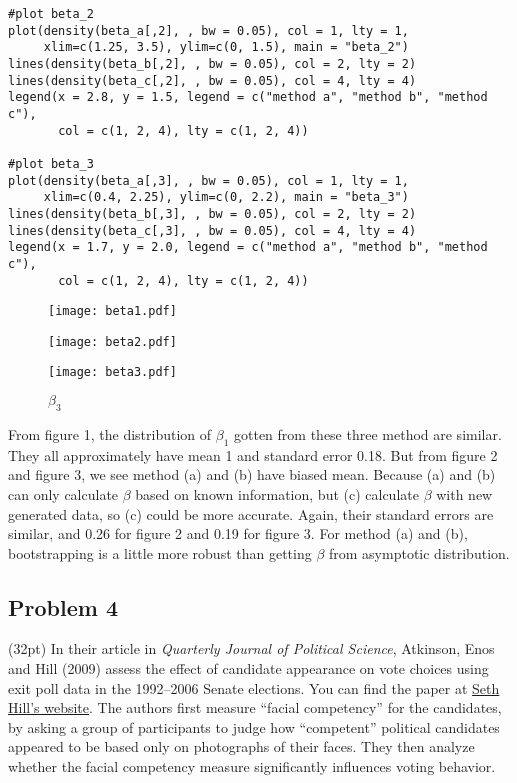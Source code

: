 \documentclass[11pt,english]{article}
\begin{document}
\begin{enumerate}
\begin{verbatim}
#plot beta_2
plot(density(beta_a[,2], , bw = 0.05), col = 1, lty = 1,
     xlim=c(1.25, 3.5), ylim=c(0, 1.5), main = "beta_2")
lines(density(beta_b[,2], , bw = 0.05), col = 2, lty = 2)
lines(density(beta_c[,2], , bw = 0.05), col = 4, lty = 4)
legend(x = 2.8, y = 1.5, legend = c("method a", "method b", "method c"),
       col = c(1, 2, 4), lty = c(1, 2, 4))

#plot beta_3
plot(density(beta_a[,3], , bw = 0.05), col = 1, lty = 1,
     xlim=c(0.4, 2.25), ylim=c(0, 2.2), main = "beta_3")
lines(density(beta_b[,3], , bw = 0.05), col = 2, lty = 2)
lines(density(beta_c[,3], , bw = 0.05), col = 4, lty = 4)
legend(x = 1.7, y = 2.0, legend = c("method a", "method b", "method c"),
       col = c(1, 2, 4), lty = c(1, 2, 4))
\end{verbatim}

\begin{figure}[H]
\begin{minipage}[t]{0.33\linewidth}
\centering
\texttt{[image: beta1.pdf]}
\caption{$\beta_{1}$}
\end{minipage}%
\begin{minipage}[t]{0.33\linewidth}
\centering
\texttt{[image: beta2.pdf]}
\caption{$\beta_{2}$}
\end{minipage}
\begin{minipage}[t]{0.33\linewidth}
\centering
\texttt{[image: beta3.pdf]}
\caption{$\beta_{3}$}
\end{minipage}
\end{figure}

From figure 1, the distribution of $\beta_{1}$ gotten from these three method are similar.  They all approximately have mean 1 and standard error 0.18.
But from figure 2 and figure 3, we see method (a) and (b) have biased mean.  Because (a) and (b) can only calculate $\beta$ based on known information, but (c) calculate $\beta$ with new generated data, so (c) could be more accurate.  Again, their standard errors are similar, and 0.26 for figure 2 and 0.19 for figure 3.  For method (a) and (b), bootstrapping is a little more robust than getting $\beta$ from asymptotic distribution.

\end{enumerate}

\subsection*{Problem 4}
(32pt) In their article in \textit{Quarterly Journal of Political
Science}, Atkinson, Enos and Hill (2009) assess the
effect of candidate appearance on vote choices using exit poll data in the 1992--2006 Senate elections. You can find the paper at \href{http://www.sethjhill.com/AEH_Faces_Final.pdf}{Seth Hill's website}. The authors first measure ``facial competency'' for the candidates, by asking a group of participants to judge how ``competent'' political candidates appeared to be based only on photographs of their faces. They then analyze whether the facial competency measure   significantly influences voting behavior.
\end{document}
